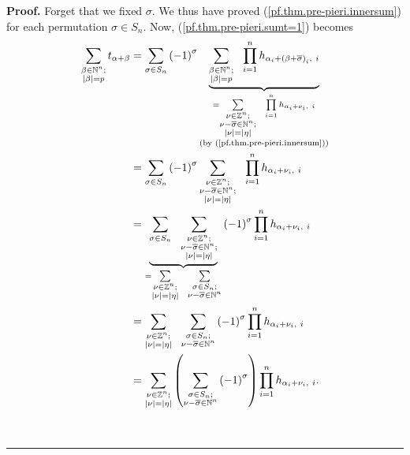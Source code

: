 \documentclass
[numbers=enddot,12pt,final,onecolumn,notitlepage,english]{scrartcl}%
\theoremstyle{definition}
\newenvironment{proof}[1][Proof]{\noindent\textbf{#1.} }{\ \rule{0.5em}{0.5em}}
\let\sumnonlimits\sum
\let\prodnonlimits\prod
\renewcommand{\sum}{\sumnonlimits\limits}
\renewcommand{\prod}{\prodnonlimits\limits}
\newenvironment{verlong}{}{}
\begin{document}
\begin{verlong}
\begin{proof}
Forget that we fixed $\sigma$. We thus have proved
(\ref{pf.thm.pre-pieri.innersum}) for each permutation $\sigma\in S_{n}$. Now,
(\ref{pf.thm.pre-pieri.sumt=1}) becomes%
\begin{align}
\sum_{\substack{\beta\in\mathbb{N}^{n};\\\left\vert \beta\right\vert
=p}}t_{\alpha+\beta}  &  =\sum_{\sigma\in S_{n}}\left(  -1\right)  ^{\sigma
}\underbrace{\sum_{\substack{\beta\in\mathbb{N}^{n};\\\left\vert
\beta\right\vert =p}}\ \ \prod_{i=1}^{n}h_{\alpha_{i}+\left(  \beta
+\overline{\sigma}\right)  _{i},\ i}}_{\substack{=\sum_{\substack{\nu
\in\mathbb{Z}^{n};\\\nu-\overline{\sigma}\in\mathbb{N}^{n};\\\left\vert
\nu\right\vert =\left\vert \eta\right\vert }}\ \ \prod_{i=1}^{n}h_{\alpha
_{i}+\nu_{i},\ i}\\\text{(by (\ref{pf.thm.pre-pieri.innersum}))}}}\nonumber\\
&  =\sum_{\sigma\in S_{n}}\left(  -1\right)  ^{\sigma}\sum_{\substack{\nu
\in\mathbb{Z}^{n};\\\nu-\overline{\sigma}\in\mathbb{N}^{n};\\\left\vert
\nu\right\vert =\left\vert \eta\right\vert }}\ \ \prod_{i=1}^{n}h_{\alpha
_{i}+\nu_{i},\ i}\nonumber\\
&  =\underbrace{\sum_{\sigma\in S_{n}}\ \ \sum_{\substack{\nu\in\mathbb{Z}%
^{n};\\\nu-\overline{\sigma}\in\mathbb{N}^{n};\\\left\vert \nu\right\vert
=\left\vert \eta\right\vert }}}_{=\sum_{\substack{\nu\in\mathbb{Z}%
^{n};\\\left\vert \nu\right\vert =\left\vert \eta\right\vert }}\ \ \sum
_{\substack{\sigma\in S_{n};\\\nu-\overline{\sigma}\in\mathbb{N}^{n}}}}\left(
-1\right)  ^{\sigma}\prod_{i=1}^{n}h_{\alpha_{i}+\nu_{i},\ i}\nonumber\\
&  =\sum_{\substack{\nu\in\mathbb{Z}^{n};\\\left\vert \nu\right\vert
=\left\vert \eta\right\vert }}\ \ \sum_{\substack{\sigma\in S_{n}%
;\\\nu-\overline{\sigma}\in\mathbb{N}^{n}}}\left(  -1\right)  ^{\sigma}%
\prod_{i=1}^{n}h_{\alpha_{i}+\nu_{i},\ i}\nonumber\\
&  =\sum_{\substack{\nu\in\mathbb{Z}^{n};\\\left\vert \nu\right\vert
=\left\vert \eta\right\vert }}\left(  \sum_{\substack{\sigma\in S_{n}%
;\\\nu-\overline{\sigma}\in\mathbb{N}^{n}}}\left(  -1\right)  ^{\sigma
}\right)  \prod_{i=1}^{n}h_{\alpha_{i}+\nu_{i},\ i}.
\label{pf.thm.pre-pieri.2}%
\end{align}



\end{proof}
\end{verlong}
\end{document}
